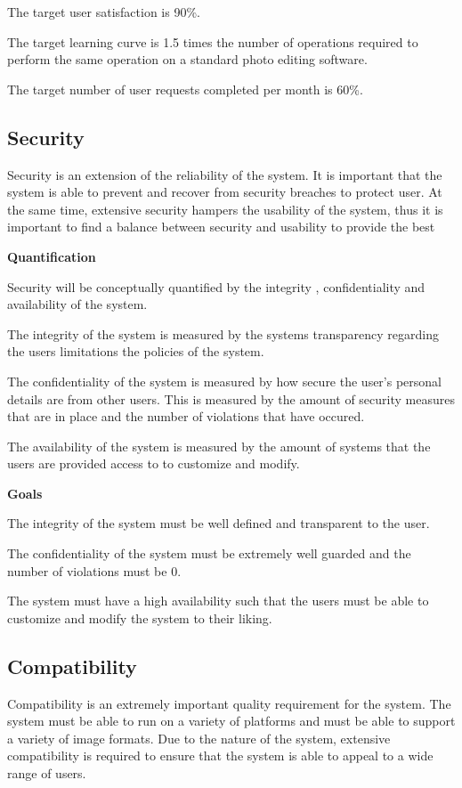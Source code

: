 \documentclass[11pt,a4paper]{article}
\begin{document}
The target user satisfaction is 90\%.

The target learning curve is 1.5 times the number of operations required to perform the same operation on a standard photo editing software.

The target number of user requests completed per month is 60\%.

\subsection*{Security}

Security is an extension of the reliability of the system. It is important that the system is able to prevent and recover from security breaches to protect user.
At the same time, extensive security hampers the usability of the system, thus it is important to find a balance between security and usability to provide the best

    {\bf Quantification}

Security will be conceptually quantified by the integrity , confidentiality and availability of the system.

The integrity of the system is measured by the systems transparency regarding the users limitations the policies of the system.

The confidentiality of the system is measured by how secure the user's personal details are from other users. This is measured by the amount of security measures that are in place and the number of violations that have occured.

The availability of the system is measured by the amount of systems that the users are provided access to to customize and modify.

    {\bf Goals}

The integrity of the system must be well defined and transparent to the user.

The confidentiality of the system must be extremely well guarded and the number of violations must be 0.

The system must have a high availability such that the users must be able to customize and modify the system to their liking.

\subsection*{Compatibility}

Compatibility is an extremely important quality requirement for the system. The system must be able to run on a variety of platforms and
must be able to support a variety of image formats. Due to the nature of the system, extensive compatibility is required to ensure that the system is able to
appeal to a wide range of users.
\end{document}
